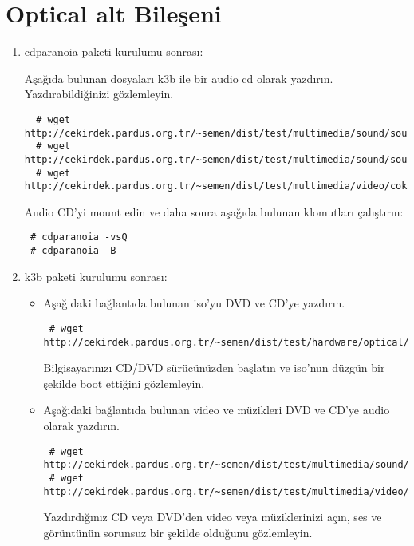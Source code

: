 \documentclass[a4paper,10pt]{article}
\begin{document}
\section{Optical alt Bileşeni}
\begin{enumerate}
 \item cdparanoia paketi kurulumu sonrası:

Aşağıda bulunan dosyaları k3b ile bir audio cd olarak yazdırın. Yazdırabildiğinizi gözlemleyin.
 \begin{verbatim}
  # wget http://cekirdek.pardus.org.tr/~semen/dist/test/multimedia/sound/sound/11k16bitpcm.wav
  # wget http://cekirdek.pardus.org.tr/~semen/dist/test/multimedia/sound/sound/music.mp3
  # wget http://cekirdek.pardus.org.tr/~semen/dist/test/multimedia/video/cokluortam/linux.ogg
 \end{verbatim}

Audio CD'yi mount edin ve daha sonra aşağıda bulunan klomutları çalıştırın:
\begin{verbatim}
 # cdparanoia -vsQ
 # cdparanoia -B
\end{verbatim}

\item k3b paketi kurulumu sonrası:
\begin{itemize}
\item Aşağıdaki bağlantıda bulunan iso'yu DVD ve CD'ye yazdırın. 
\begin{verbatim}
 # wget http://cekirdek.pardus.org.tr/~semen/dist/test/hardware/optical/boot.iso
\end{verbatim}

Bilgisayarınızı CD/DVD sürücünüzden başlatın ve iso'nun düzgün bir şekilde boot ettiğini gözlemleyin.

\item Aşağıdaki bağlantıda bulunan video ve müzikleri DVD ve CD'ye audio olarak yazdırın. 
\begin{verbatim}
 # wget http://cekirdek.pardus.org.tr/~semen/dist/test/multimedia/sound/sound.tar
 # wget http://cekirdek.pardus.org.tr/~semen/dist/test/multimedia/video/cokluortam.tar
\end{verbatim}
Yazdırdığınız CD veya DVD'den video veya müziklerinizi açın, ses ve görüntünün sorunsuz bir şekilde olduğunu gözlemleyin.

\end{itemize}

\end{enumerate}
\end{document}
